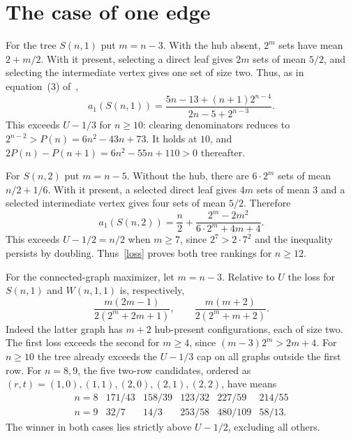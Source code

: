 \documentclass[11pt,a4paper]{article}
\newcommand{\av}{a}
\begin{document}
\section{The case of one edge}
For the tree $S(n,1)$ put $m=n-3$. With the hub absent, $2^m$ sets have mean $2+m/2$. With it present, selecting a direct leaf gives $2m$ sets of mean $5/2$, and selecting the intermediate vertex gives one set of size two. Thus, as in equation~(3) of~\cite{DA},
\[
\av_1(S(n,1))=\frac{5n-13+(n+1)2^{n-4}}{2n-5+2^{n-3}}.
\]
This exceeds $U-1/3$ for $n\ge10$: clearing denominators reduces to $2^{n-2}>P(n)=6n^2-43n+73$. It holds at $10$, and $2P(n)-P(n+1)=6n^2-55n+110>0$ thereafter.

For $S(n,2)$ put $m=n-5$. Without the hub, there are $6\cdot2^m$ sets of mean $n/2+1/6$. With it present, a selected direct leaf gives $4m$ sets of mean $3$ and a selected intermediate vertex gives four sets of mean $5/2$. Therefore
\[
\av_1(S(n,2))=\frac n2+\frac{2^m-2m^2}{6\cdot2^m+4m+4}.
\]
This exceeds $U-1/2=n/2$ when $m\ge7$, since $2^7>2\cdot7^2$ and the inequality persists by doubling. Thus~\eqref{loss} proves both tree rankings for $n\ge12$.

For the connected-graph maximizer, let $m=n-3$. Relative to $U$ the loss for $S(n,1)$ and $W(n,1,1)$ is, respectively,
\[
\frac{m(2m-1)}{2(2^m+2m+1)},\qquad\frac{m(m+2)}{2(2^m+m+2)}.
\]
Indeed the latter graph has $m+2$ hub-present configurations, each of size two. The first loss exceeds the second for $m\ge4$, since $(m-3)2^m>2m+4$. For $n\ge10$ the tree already exceeds the $U-1/3$ cap on all graphs outside the first row. For $n=8,9$, the five two-row candidates, ordered as $(r,t)=(1,0),(1,1),(2,0),(2,1),(2,2)$, have means
\[
\begin{array}{c|ccccc}
n=8 &171/43&158/39&123/32&227/59&214/55\\
n=9 &32/7&14/3&253/58&480/109&58/13.
\end{array}
\]
The winner in both cases lies strictly above $U-1/2$, excluding all others.
\end{document}
